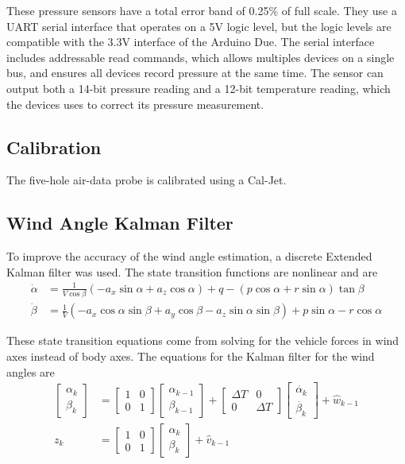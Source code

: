 These pressure sensors have a total error band of 0.25\% of full scale. They use a UART serial interface that operates on a 5V logic level, but the logic levels are compatible with the 3.3V interface of the Arduino Due. The serial interface includes addressable read commands, which allows multiples devices on a single bus, and ensures all devices record pressure at the same time. The sensor can output both a 14-bit pressure reading and a 12-bit temperature reading, which the devices uses to correct its pressure measurement.

\subsection{Calibration}
The five-hole air-data probe is calibrated using a Cal-Jet.

\subsection{Wind Angle Kalman Filter}

To improve the accuracy of the wind angle estimation, a discrete Extended Kalman filter was used. The state transition functions are nonlinear and are
\begin{align}
\dot{\alpha} & = \frac{1}{V\cos\beta}(-a_x\sin\alpha+a_z\cos\alpha)+q-(p\cos\alpha+r\sin\alpha)\tan\beta\\
\dot{\beta} &=\frac{1}{V}(-a_x\cos\alpha\sin\beta+a_y\cos\beta-a_z\sin\alpha\sin\beta)+p\sin\alpha-r\cos\alpha
\end{align}

These state transition equations come from solving for the vehicle forces in wind axes instead of body axes\cite{klein2006aircraft}. The equations for the Kalman filter for the wind angles are
\begin{align}
\begin{bmatrix}
\alpha_k\\\beta_k
\end{bmatrix} &= \begin{bmatrix}
1& 0\\0&1
\end{bmatrix}\begin{bmatrix}
\alpha_{k-1}\\\beta_{k-1}
\end{bmatrix}+\begin{bmatrix}
\Delta T& 0\\0&\Delta T
\end{bmatrix}\begin{bmatrix}
\dot{\alpha_{k}}\\\dot{\beta_{k}}
\end{bmatrix}+\hat{w}_{k-1}\\
z_k & = \begin{bmatrix}
1 & 0\\0&1
\end{bmatrix}\begin{bmatrix}
\alpha_{k}\\
\beta_{k}
\end{bmatrix}+\hat{v}_{k-1}
\end{align}

